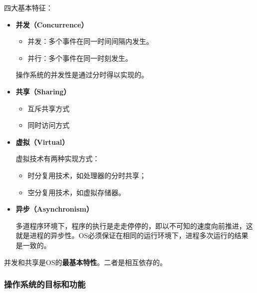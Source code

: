 \documentclass[12pt, a4paper, oneside]{ctexart}
\begin{document}
四大基本特征：
\begin{itemize}
  \item {\bf 并发（Concurrence）}
  \begin{itemize}
    \item 并发：多个事件在同一时间间隔内发生。
    \item 并行：多个事件在同一时刻发生。
  \end{itemize}
  操作系统的并发性是通过分时得以实现的。
  \item {\bf 共享（Sharing）}
  \begin{itemize}
    \item 互斥共享方式
    \item 同时访问方式
  \end{itemize}
  \item {\bf 虚拟（Virtual）}
  
  虚拟技术有两种实现方式：
  \begin{itemize}
    \item 时分复用技术，如处理器的分时共享；
    \item 空分复用技术，如虚拟存储器。
  \end{itemize}
  \item {\bf 异步（Asynchronism）}
  
  多道程序环境下，程序的执行是走走停停的，即以不可知的速度向前推进，这就是进程的异步性。OS必须保证在相同的运行环境下，进程多次运行的结果是一致的。
\end{itemize}

并发和共享是OS的\textbf{最基本特性}。二者是相互依存的。

\subsubsection{操作系统的目标和功能}
\end{document}
